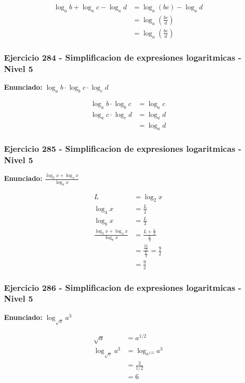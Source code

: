 \documentclass[12pt,a4paper]{article}
\begin{document}
\[
\begin{aligned}
\log_a b+\log_a c-\log_a d&=\log_a(bc)-\log_a d\\
&=\log_a\left(\frac{bc}{d}\right)\\
&=\boxed{\log_a\left(\frac{bc}{d}\right)}
\end{aligned}
\]


\subsubsection*{Ejercicio 284 - Simplificacion de expresiones logaritmicas - Nivel 5}
\textbf{Enunciado:} \(\log_a b\cdot\log_b c\cdot\log_c d\)

\[
\begin{aligned}
\log_a b\cdot\log_b c&=\log_a c\\
\log_a c\cdot\log_c d&=\log_a d\\
&=\boxed{\log_a d}
\end{aligned}
\]


\subsubsection*{Ejercicio 285 - Simplificacion de expresiones logaritmicas - Nivel 5}
\textbf{Enunciado:} \(\frac{\log_2 x+\log_4 x}{\log_8 x}\)

\[
\begin{aligned}
L&=\log_2 x\\
\log_4 x&=\frac{L}{2}\\
\log_8 x&=\frac{L}{3}\\
\frac{\log_2 x+\log_4 x}{\log_8 x}&=\frac{L+\frac L2}{\frac L3}\\
&=\frac{\frac{3L}{2}}{\frac L3}=\frac92\\
&=\boxed{\frac92}
\end{aligned}
\]


\subsubsection*{Ejercicio 286 - Simplificacion de expresiones logaritmicas - Nivel 5}
\textbf{Enunciado:} \(\log_{\sqrt a}a^3\)

\[
\begin{aligned}
\sqrt a&=a^{1/2}\\
\log_{\sqrt a}a^3&=\log_{a^{1/2}}a^3\\
&=\frac{3}{1/2}\\
&=\boxed{6}
\end{aligned}
\]
\end{document}
